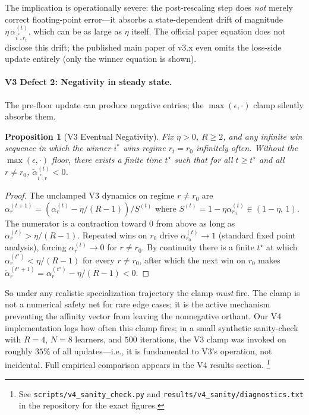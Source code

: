 \documentclass[11pt,a4paper]{article}
\theoremstyle{definition}
\theoremstyle{plain}
\newtheorem{proposition}{Proposition}[section]
\begin{document}
\noindent The implication is operationally severe: the post-rescaling
step does \emph{not} merely correct floating-point error---it absorbs a
state-dependent drift of magnitude $\eta\,\alpha_{i^*,r_t}^{(t)}$, which
can be as large as $\eta$ itself. The official paper equation does not
disclose this drift; the published main paper of v3.x even omits the
loss-side update entirely (only the winner equation is shown).

\paragraph{V3 Defect 2: Negativity in steady state.}
The pre-floor update can produce negative entries; the $\max(\epsilon,\cdot)$
clamp silently absorbs them.

\begin{proposition}[V3 Eventual Negativity]
\label{prop:v3_negativity}
Fix $\eta > 0$, $R \geq 2$, and any infinite win sequence in which the
winner $i^*$ wins regime $r_t = r_0$ infinitely often. Without the
$\max(\epsilon,\cdot)$ floor, there exists a finite time $t^\star$ such
that for all $t \geq t^\star$ and all $r \neq r_0$,
$\tilde{\alpha}_{i^*,r}^{(t)} < 0$.
\end{proposition}

\begin{proof}
The unclamped V3 dynamics on regime $r \neq r_0$ are
$\alpha_r^{(t+1)} = (\alpha_r^{(t)} - \eta/(R-1)) / S^{(t)}$
where $S^{(t)} = 1 - \eta\alpha_{r_0}^{(t)} \in (1-\eta,\,1)$. The numerator
is a contraction toward $0$ from above as long as $\alpha_r^{(t)} > \eta/(R-1)$.
Repeated wins on $r_0$ drive $\alpha_{r_0}^{(t)} \to 1$ (standard fixed
point analysis), forcing $\alpha_r^{(t)} \to 0$ for $r \neq r_0$.
By continuity there is a finite $t^\star$ at which $\alpha_r^{(t^\star)} <
\eta/(R-1)$ for every $r \neq r_0$, after which the next win on $r_0$
makes $\tilde{\alpha}_r^{(t^\star+1)} = \alpha_r^{(t^\star)} - \eta/(R-1) < 0$.
\end{proof}

\noindent So under any realistic specialization trajectory the clamp
\emph{must} fire. The clamp is not a numerical safety net for rare edge
cases; it is the active mechanism preventing the affinity vector from
leaving the nonnegative orthant. Our V4 implementation logs how often
this clamp fires; in a small synthetic sanity-check with $R=4$, $N=8$
learners, and $500$ iterations, the V3 clamp was invoked on roughly
$35\%$ of all updates---i.e., it is fundamental to V3's operation, not
incidental. Full empirical comparison appears in the V4 results section.%
\footnote{See \texttt{scripts/v4\_sanity\_check.py} and
\texttt{results/v4\_sanity/diagnostics.txt} in the repository for the
exact figures.}
\end{document}
